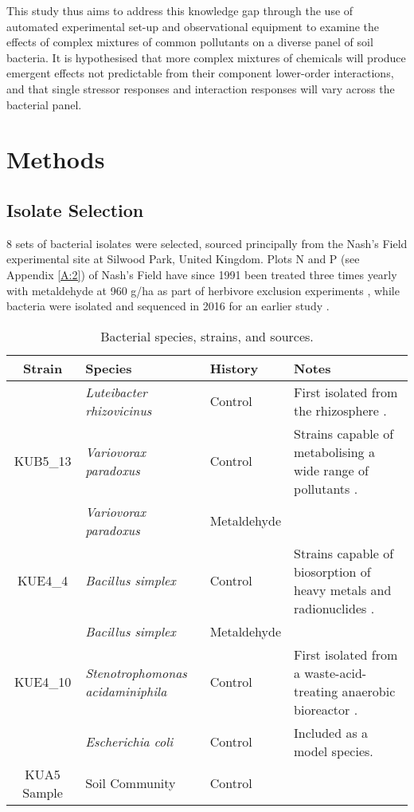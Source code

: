 \documentclass[final,1p,times]{elsarticle}
\begin{document}
This study thus aims to address this knowledge gap through the use of automated experimental set-up and observational equipment to examine the effects of complex mixtures of common pollutants on a diverse panel of soil bacteria. It is hypothesised that more complex mixtures of chemicals will produce emergent effects not predictable from their component lower-order interactions, and that single stressor responses and interaction responses will vary across the bacterial panel.

\section{Methods}
\label{S:2}
\subsection{Isolate Selection}
\label{S:2:1}

8 sets of bacterial isolates  were selected, sourced principally from the Nash's Field experimental site at Silwood Park, United Kingdom. Plots N and P (see Appendix \ref{A:2}) of Nash's Field have since 1991 been treated three times yearly with metaldehyde at 960 g/ha as part of herbivore exclusion experiments \cite{Allan2011ContrastingExperiment}, while bacteria were isolated and sequenced in 2016 for an earlier study \cite{Mombrikotb2016}. 

\begin{table}[ht]
\begin{small}
\centering
\begin{tabular}{c p{3.1cm} l p{5.2cm}}
\toprule 
{Strain} & {Species} & {History} & {Notes} \\
\midrule
\rowcolor{black!20}{LUF4\_5} & \textit{Luteibacter rhizovicinus} & Control & First isolated from the rhizosphere \cite{Johansen2005LuteibacterL.}. \\
{KUB5\_13} & \textit{Variovorax paradoxus} & Control & Strains capable of metabolising a wide range of pollutants \cite{Satola2013MetabolicParadoxus}. \\
\rowcolor{black!20}{NUF1\_3} & \textit{Variovorax paradoxus} & Metaldehyde & \\
{KUE4\_4} & \textit{Bacillus simplex} & Control & Strains capable of biosorption of heavy metals and radionuclides \cite{Valentine1996BiosorptionZone}. \\
\rowcolor{black!20}{NUE1\_1} & \textit{Bacillus simplex} & Metaldehyde & \\
{KUE4\_10} & \textit{Stenotrophomonas \newline acidaminiphila} & Control & First isolated from a waste-acid-treating anaerobic bioreactor \cite{Assih2002}. \\
\rowcolor{black!20}{OP50} & \textit{Escherichia coli} & Control & Included as a model species. \\
{KUA5 Sample} & Soil Community & Control & \\
\bottomrule
\end{tabular}
\caption{Bacterial species, strains, and sources.}
\label{tab:isolates}
\end{small}
\end{table}
\end{document}

